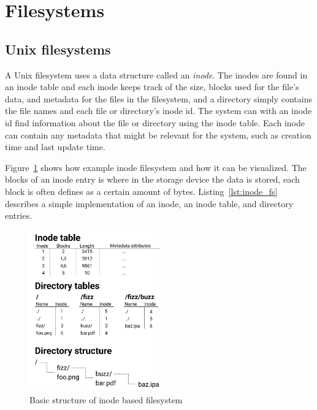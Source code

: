 \section{Filesystems}
\subsection{Unix filesystems}
A Unix filesystem uses a data structure called an \textit{inode}. The inodes are found in an inode table and each inode keeps track of the size, blocks used for the file's data, and metadata for the files in the filesystem, and a directory simply contains the file names and each file or directory's inode id. The system can with an inode id find information about the file or directory using the inode table. Each inode can contain any metadata that might be relevant for the system, such as creation time and last update time. 

Figure~\ref{fig:inode_diag} shows how example inode filesystem and how it can be visualized. The blocks of an inode entry is where in the storage device the data is stored, each block is often defines as a certain amount of bytes. Listing~\ref{lst:inode_fs} describes a simple implementation of an inode, an inode table, and directory entries. 


\begin{figure}[!ht]
	\begin{center}
	  \includegraphics[width=0.5\textwidth]{figures/inode_diagram.png}
	\end{center}
	\caption{Basic structure of inode based filesystem}
	\label{fig:inode_diag}
\end{figure}

